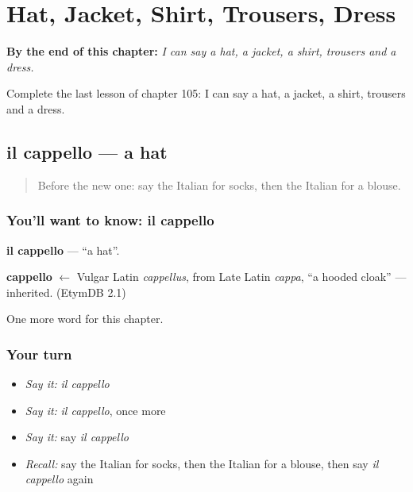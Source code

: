 
\chapter{Hat, Jacket, Shirt, Trousers, Dress}
\label{ch:it-hat-jacket-shirt-trousers-dress}

\begin{chapteropening}
\textbf{By the end of this chapter:} \emph{I can say a hat, a jacket, a shirt, trousers and a dress.}

Complete the last lesson of chapter 105: I can say a hat, a jacket, a shirt, trousers and a dress.
\end{chapteropening}

\section[il cappello]{il cappello — a hat}

\label{lesson:IT-C105-cappello}



\begin{quote}
Before the new one: say the Italian for socks, then the Italian for a blouse.
\end{quote}

\subsection*{You'll want to know: il cappello}
\textbf{il cappello} — \textquotedblleft{}a hat\textquotedblright{}.

\begin{cousinweb}
\textbf{cappello} $\leftarrow$ Vulgar Latin \emph{cappellus}, from Late Latin \emph{cappa}, \textquotedblleft{}a hooded cloak\textquotedblright{} — inherited. (EtymDB 2.1)
\end{cousinweb}

\begin{grammarlens}[title={What you've built}]
One more word for this chapter.
\end{grammarlens}

\subsection*{Your turn}
\begin{itemize}
\raggedright
  \item \emph{Say it:} \emph{il cappello}
  \item \emph{Say it:} \emph{il cappello}, once more
  \item \emph{Say it:} say \emph{il cappello}
  \item \emph{Recall:} say the Italian for socks, then the Italian for a blouse, then say \emph{il cappello} again
\end{itemize}

